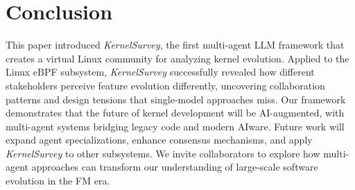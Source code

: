 \documentclass[sigconf,review,anonymous]{acmart}
\begin{document}





\section{Conclusion}

This paper introduced \emph{KernelSurvey}, the first multi-agent LLM framework that creates a virtual Linux community for analyzing kernel evolution. Applied to the Linux eBPF subsystem, \emph{KernelSurvey} successfully revealed how different stakeholders perceive feature evolution differently, uncovering collaboration patterns and design tensions that single-model approaches miss. Our framework demonstrates that the future of kernel development will be AI-augmented, with multi-agent systems bridging legacy code and modern AIware. Future work will expand agent specializations, enhance consensus mechanisms, and apply \emph{KernelSurvey} to other subsystems. We invite collaborators to explore how multi-agent approaches can transform our understanding of large-scale software evolution in the FM era.


    
\end{document}
